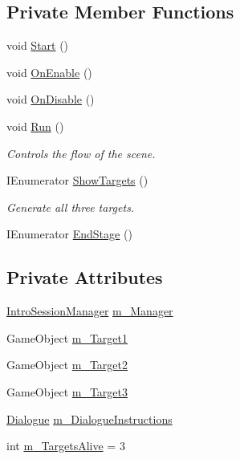 \subsection*{Private Member Functions}
\begin{DoxyCompactItemize}
\item 
void \mbox{\hyperlink{class_stage6_a0b1886eba20acc62966ff105e1ea51ed}{Start}} ()
\item 
void \mbox{\hyperlink{class_stage6_af13c178e81408130bc3178d88892fbef}{On\+Enable}} ()
\item 
void \mbox{\hyperlink{class_stage6_a2482ff2ad4b567c6c7308e7623ed2edd}{On\+Disable}} ()
\item 
void \mbox{\hyperlink{class_stage6_aad2cee8912a53eeb0f784e82a3a4e484}{Run}} ()
\begin{DoxyCompactList}\small\item\em Controls the flow of the scene. \end{DoxyCompactList}\item 
I\+Enumerator \mbox{\hyperlink{class_stage6_a5270b2b7fdc0958c4a9660f3528e2ebe}{Show\+Targets}} ()
\begin{DoxyCompactList}\small\item\em Generate all three targets. \end{DoxyCompactList}\item 
I\+Enumerator \mbox{\hyperlink{class_stage6_a1b5fa30c896fa0572746a20b6b3ebf71}{End\+Stage}} ()
\end{DoxyCompactItemize}
\subsection*{Private Attributes}
\begin{DoxyCompactItemize}
\item 
\mbox{\hyperlink{class_intro_session_manager}{Intro\+Session\+Manager}} \mbox{\hyperlink{class_stage6_ac4c230082e1cedefe1fee939af37addf}{m\+\_\+\+Manager}}
\item 
Game\+Object \mbox{\hyperlink{class_stage6_a48fe2476a0487b858be72ff53c6cddf7}{m\+\_\+\+Target1}}
\item 
Game\+Object \mbox{\hyperlink{class_stage6_a1756b8683311b102151c8307a2ac3055}{m\+\_\+\+Target2}}
\item 
Game\+Object \mbox{\hyperlink{class_stage6_ae64ded8ee411b39e0f939cf98bea940b}{m\+\_\+\+Target3}}
\item 
\mbox{\hyperlink{class_dialogue}{Dialogue}} \mbox{\hyperlink{class_stage6_a56acf5cd644988878b80fa187239f1fc}{m\+\_\+\+Dialogue\+Instructions}}
\item 
int \mbox{\hyperlink{class_stage6_a5453b72c92f4f68eba7675f26be39f59}{m\+\_\+\+Targets\+Alive}} = 3
\end{DoxyCompactItemize}


